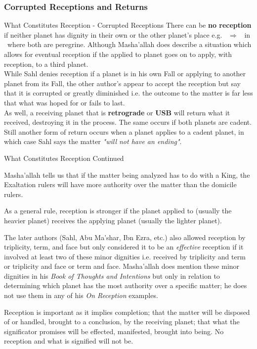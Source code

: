 \subsubsection{Corrupted Receptions and Returns}
\begin{frame}[t]{What Constitutes Reception - Corrupted Receptions}
There can be \textbf{no reception} if neither planet has dignity in their own or the other planet's place e.g. \Mercury\ $\Rightarrow$ \Jupiter\ in \Taurus\ where both are peregrine. Although Masha'allah does describe a situation which allows for eventual reception if the applied to planet goes on to apply, with reception, to a third planet.\\
\vspace{0.25cm}
While Sahl denies reception if a planet is in his own Fall or applying to another planet from its Fall, the other author's appear to accept the reception but say that it is corrupted or greatly diminished i.e. the outcome to the matter is far less that what was hoped for or fails to last.\\
\vspace{0.25cm}
As well, a receiving planet that is \textbf{retrograde} or \textbf{USB} will return what it received, destroying it in the process. The same occurs if both planets are cadent.\footnotemark[1] \\
\vspace{0.25cm}
Still another form of return occurs when a planet applies to a cadent planet, in which case Sahl says the matter \textsl{"will not have an ending"}.

\end{frame}
\begin{frame}[t]{What Constitutes Reception Continued}

Masha'allah tells us that if the matter being analyzed has to do with a King, the Exaltation rulers will have more authority over the matter than the domicile rulers.

As a general rule, reception is stronger if the planet applied to (usually the heavier planet) receives the applying planet (usually the lighter planet).

The later authors (Sahl, Abu Ma'shar, Ibn Ezra, etc.) also allowed reception by triplicity, term, and face but only considered it to be an \textsl{effective} reception if it involved at least two of these minor dignities i.e. received by triplicity and term or triplicity and face or term and face. Masha'allah does mention these minor dignities in his \textsl{Book of Thoughts and Intentions} but only in relation to determining which planet has the most authority over a specific matter; he does not use them in any of his \textsl{On Reception} examples.
\begin{block}{}
Reception is important as it implies completion; that the matter will be disposed of or handled, brought to a conclusion, by the receiving planet; that what the significator promises will be effected, manifested, brought into being. No reception and what is signified will not be.
\end{block}
\end{frame}